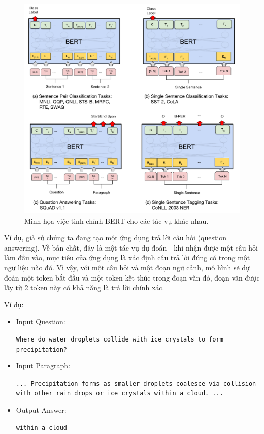 \begin{figure}[htb]
    \centering
    \includegraphics[width=\textwidth]{image/BERT_fine_tune.pdf}
    \caption{Minh họa việc tinh chỉnh BERT cho các tác vụ khác nhau.}
    \label{figure:BERT_fine_tuning}
\end{figure}

Ví dụ, giả sử chúng ta đang tạo một ứng dụng trả lời câu hỏi (question answering). Về bản chất, đây là một tác vụ dự đoán - khi nhận được một câu hỏi làm đầu vào, mục tiêu của ứng dụng là xác định câu trả lời đúng có trong một ngữ liệu nào đó. Vì vậy, với một câu hỏi và một đoạn ngữ cảnh, mô hình sẽ dự đoán một token bắt đầu và một token kết thúc trong đoạn văn đó, đoạn văn được lấy từ 2 token này có khả năng là trả lời chính xác.
 
Ví dụ: 

\begin{itemize}
    \item Input Question: 
    
    {\tt {\scriptsize  Where do water droplets collide with ice crystals to form precipitation?}}

    \item Input Paragraph: 
    
    {\tt {\scriptsize  ... Precipitation forms as smaller droplets coalesce via collision with other rain drops or ice crystals within a cloud. ...}}

    \item Output Answer: 
    
    {\tt {\scriptsize  within a cloud}}
\end{itemize}

